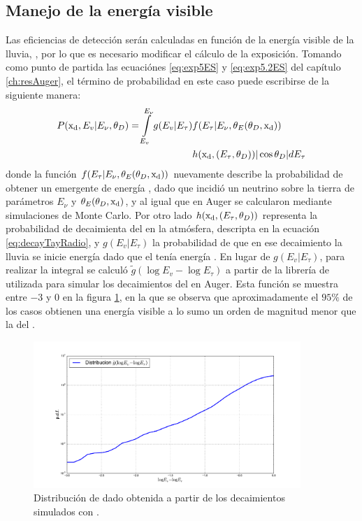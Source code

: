 	\subsection{Manejo de la energ\'ia visible}
	Las eficiencias de detecci\'on ser\'an calculadas en funci\'on de la energ\'ia visible de la lluvia, \ev{}, por lo que es necesario modificar el c\'alculo de la exposici\'on.
	Tomando como punto de partida las ecuaci\'ones \ref{eq:exp5ES} y \ref{eq:exp5.2ES} del cap\'itulo \ref{ch:resAuger}, el t\'ermino de probabilidad en este caso puede escribirse de la siguiente manera:
	\begin{equation}
		\begin{aligned}
		P({\rm x_d},E_v|E_{\nu},\theta_D)=
		\int\limits_{E_v}^{E_\nu}
		g(E_v|E_\tau)
		& f(E_\tau|E_\nu,\theta_E(\theta_D,{\rm x_d}))\\
		&h({\rm x_d},(E_\tau,\theta_D))
		|\cos\theta_D|
		dE_\tau
		\end{aligned}
	\end{equation}
	donde la funci\'on $f(E_\tau|E_\nu,\theta_E(\theta_D,{\rm x_d}))$ nuevamente describe la probabilidad de obtener un \tauon{} emergente de energ\'ia \etau{}, dado que incidi\'o un neutrino sobre la tierra de par\'ametros $E_\nu$ y $\theta_E(\theta_D,{\rm x_d})$, y al igual que en Auger se calcularon mediante simulaciones de Monte Carlo.
	Por otro lado $h({\rm x_d},(E_\tau,\theta_D))$ representa la probabilidad de decaimienta del \tauon{} en la atm\'osfera, descripta en la ecuaci\'on \ref{eq:decayTayRadio}, y $g(E_v|E_\tau)$ la probabilidad de que en ese decaimiento la lluvia se inicie energ\'ia \ev{} dado que el \tauon{} ten\'ia energ\'ia \etau{}.
	En lugar de $g(E_v|E_\tau)$, para realizar la integral se calcul\'o $\tilde{g}(\log E_v-\log E_\tau)$ a partir de la librer\'ia de \tauola{} utilizada para simular los decaimientos del \tauon{} en Auger.
	Esta funci\'on se muestra entre $-3$ y $0$ en la figura \ref{fig:ev_etau}, en la que se observa que aproximadamente el $95\%$ de los casos obtienen una energ\'ia visible a lo sumo un orden de magnitud menor que la del \tauon{}.
	 \begin{figure}[h!]
		\begin{center}
			\includegraphics[width=0.9\textwidth]{fig/resultadosRadio/ev_etau}
			\caption{\label{fig:ev_etau} 
			Distribuci\'on de \ev{} dado \etau{} obtenida a partir de los decaimientos simulados con \tauola{}. 
			}
		\end{center}
	\end{figure}
	 

